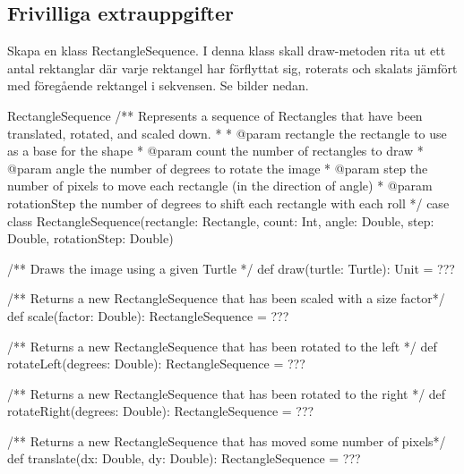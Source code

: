 \subsection{Frivilliga extrauppgifter}


\Task Skapa en klass RectangleSequence. I denna klass skall draw-metoden rita ut ett antal rektanglar där varje rektangel har förflyttat sig, roterats och skalats jämfört med föregående rektangel i sekvensen. Se bilder nedan.


\begin{ScalaSpec}{RectangleSequence}
/** Represents a sequence of Rectangles that have been translated,
    rotated, and scaled down.
  *
  * @param rectangle        the rectangle to use as a base for the shape
  * @param count            the number of rectangles to draw
  * @param angle            the number of degrees to rotate the image
  * @param step             the number of pixels to move each rectangle
                            (in the direction of angle)
  * @param rotationStep     the number of degrees to shift each rectangle
                            with each roll
  */
case class RectangleSequence(rectangle: Rectangle,
                             count: Int,
                             angle: Double,
                             step: Double,
                             rotationStep: Double) {

  /** Draws the image using a given Turtle */
  def draw(turtle: Turtle): Unit = ???

  /** Returns a new RectangleSequence that has been scaled with a size factor*/
  def scale(factor: Double): RectangleSequence = ???

  /** Returns a new RectangleSequence that has been rotated to the left */
  def rotateLeft(degrees: Double): RectangleSequence = ???

  /** Returns a new RectangleSequence that has been rotated to the right */
  def rotateRight(degrees: Double): RectangleSequence = ???

  /** Returns a new RectangleSequence that has moved some number of pixels*/
  def translate(dx: Double, dy: Double): RectangleSequence = ???
}
\end{ScalaSpec}

